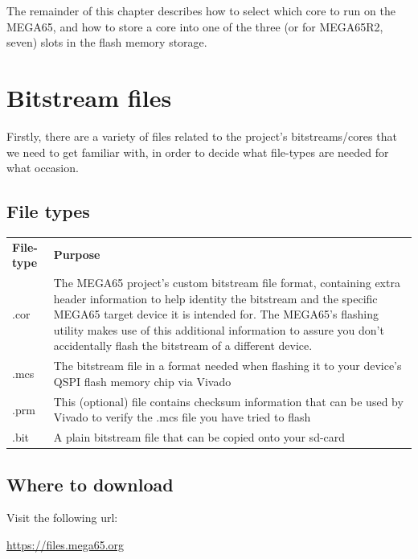 The remainder of this chapter describes how to select which core to run on the MEGA65, and
how to store a core into one of the three (or for MEGA65R2, seven) slots in the flash memory storage.

\section{Bitstream files}
\label{sec:bitstreamfiles}

Firstly, there are a variety of files related to the project's bitstreams/cores that we need to get familiar with, in order to decide what file-types are needed for what occasion.

\subsection{File types}

\begin{center}
  \begin{longtable}{|R{2.2cm}|p{10cm}|}
  \hline
    {\textbf{File-type}} & {\textbf{Purpose}} \\
  \hhline{|=|=|}
  {.cor} & {The MEGA65 project's custom bitstream file format, containing extra header information to help identity the bitstream and the specific MEGA65 target device it is intended for. The MEGA65's flashing utility makes use of this additional information to assure you don't accidentally flash the bitstream of a different device.} \\
  \hline
  {.mcs} & {The bitstream file in a format needed when flashing it to your device's QSPI flash memory chip via Vivado} \\
  \hline
  {.prm} & {This (optional) file contains checksum information that can be used by Vivado to verify the .mcs file you have tried to flash} \\
  \hline
  {.bit} & {A plain bitstream file that can be copied onto your sd-card} \\
  \hline
  \end{longtable}
\end{center}

\subsection{Where to download}

Visit the following url:

\url{https://files.mega65.org}

